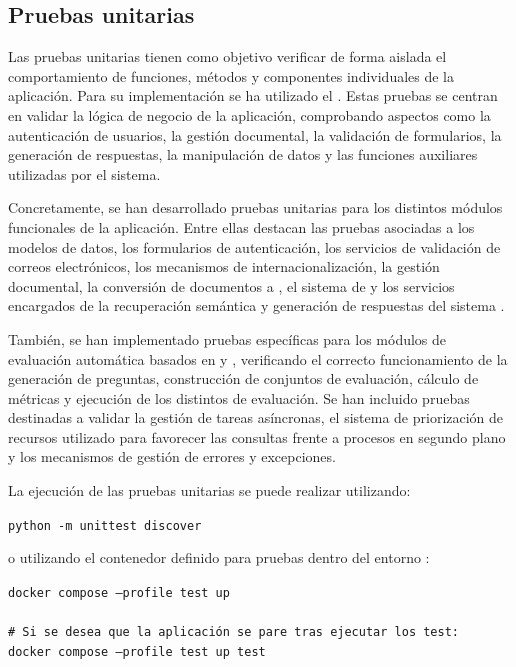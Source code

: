 \subsection{Pruebas unitarias}

Las pruebas unitarias tienen como objetivo verificar de forma aislada el comportamiento de funciones, métodos y componentes individuales de la aplicación. Para su implementación se ha utilizado el  . Estas pruebas se centran en validar la lógica de negocio de la aplicación, comprobando aspectos como la autenticación de usuarios, la gestión documental, la validación de formularios, la generación de respuestas, la manipulación de datos y las funciones auxiliares utilizadas por el sistema.

Concretamente, se han desarrollado pruebas unitarias para los distintos módulos funcionales de la aplicación. Entre ellas destacan las pruebas asociadas a los modelos de datos, los formularios de autenticación, los servicios de validación de correos electrónicos, los mecanismos de internacionalización, la gestión documental, la conversión de documentos a , el sistema de  y los servicios encargados de la recuperación semántica y generación de respuestas del sistema .

También, se han implementado pruebas específicas para los módulos de evaluación automática basados en  y , verificando el correcto funcionamiento de la generación de preguntas, construcción de conjuntos de evaluación, cálculo de métricas y ejecución de los distintos  de evaluación. Se han incluido pruebas destinadas a validar la gestión de tareas asíncronas, el sistema de priorización de recursos utilizado para favorecer las consultas  frente a procesos en segundo plano y los mecanismos de gestión de errores y excepciones.

La ejecución de las pruebas unitarias se puede realizar utilizando:

\begin{tcolorbox}[
	colback=black!3,
	colframe=black!30,
	boxrule=0.5pt,
	arc=2mm,
	title= Terminal - Ejecución de pruebas unitarias,
	fonttitle=\bfseries,
	breakable 
]
	{\footnotesize
		\noindent
		\texttt{python -m unittest discover}
	}
\end{tcolorbox}

o utilizando el contenedor definido para pruebas dentro del entorno :

\begin{tcolorbox}[
	colback=black!3,
	colframe=black!30,
	boxrule=0.5pt,
	arc=2mm,
	title= Terminal - Ejecución de pruebas mediante Docker,
	fonttitle=\bfseries,
	breakable 
]
	{\footnotesize
		\noindent
		\texttt{docker compose --profile test up}\\
		\\
		\texttt{\# Si se desea que la aplicación se pare tras ejecutar los test:}\\
		\texttt{docker compose --profile test up test}
	}
\end{tcolorbox}

